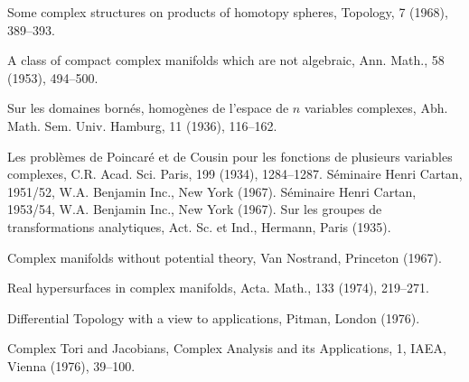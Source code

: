 \begin{sourcebibliography}
 Some complex structures on products of homotopy spheres, Topology, 7 (1968), 389--393.
\end{sourcebibliography}
\begin{sourcebibliography}
 A class of compact complex manifolds which are not algebraic, Ann. Math., 58 (1953), 494--500.
\end{sourcebibliography}
\begin{sourcebibliography}
 Sur les domaines born\'es, homog\`enes de l'espace de $n$ variables complexes, Abh. Math. Sem. Univ. Hamburg, 11 (1936), 116--162.
\end{sourcebibliography}
\begin{sourcebibliography}
 Les probl\`emes de Poincar\'e et de Cousin pour les fonctions de plusieurs variables complexes, C.R. Acad. Sci. Paris, 199 (1934), 1284--1287.
 S\'eminaire Henri Cartan, 1951/52, W.A. Benjamin Inc., New York (1967).
 S\'eminaire Henri Cartan, 1953/54, W.A. Benjamin Inc., New York (1967).
 Sur les groupes de transformations analytiques, Act. Sc. et Ind., Hermann, Paris (1935).
\end{sourcebibliography}
\begin{sourcebibliography}
 Complex manifolds without potential theory, Van Nostrand, Princeton (1967).
\end{sourcebibliography}
\begin{sourcebibliography}
 Real hypersurfaces in complex manifolds, Acta. Math., 133 (1974), 219--271.
\end{sourcebibliography}
\begin{sourcebibliography}
 Differential Topology with a view to applications, Pitman, London (1976).
\end{sourcebibliography}
\begin{sourcebibliography}
 Complex Tori and Jacobians, Complex Analysis and its Applications, 1, IAEA, Vienna (1976), 39--100.
\end{sourcebibliography}
